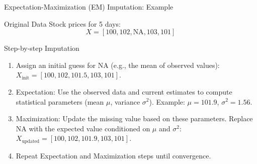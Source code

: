 \documentclass{beamer}
\begin{document}
\begin{frame}{Expectation-Maximization (EM) Imputation: Example}
   \begin{block}{Original Data}
       Stock prices for 5 days:
       \[
       X = [100, 102, \text{NA}, 103, 101]
       \]
   \end{block}

   \begin{block}{Step-by-step Imputation}
       \begin{enumerate}
           \item Assign an initial guess for $\text{NA}$ (e.g., the mean of observed values):
           $X_{\text{init}} = [100, 102, 101.5, 103, 101]$.

           \item Expectation: Use the observed data and current estimates to compute statistical parameters (mean $\mu$, variance $\sigma^2$).
           Example: $\mu = 101.9$, $\sigma^2 = 1.56$.

           \item Maximization: Update the missing value based on these parameters. Replace $\text{NA}$ with the expected value conditioned on $\mu$ and $\sigma^2$:\\
           $X_{\text{updated}} = [100, 102, \mathbf{101.9}, 103, 101]$.

           \item Repeat Expectation and Maximization steps until convergence.
       \end{enumerate}
   \end{block}

\end{frame}
\end{document}
